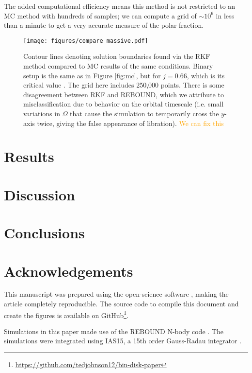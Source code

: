 \documentclass[twocolumn]{aastex631}
\newcommand\ghurl[0]{\url{https://github.com/tedjohnson12/bin-disk-paper}}
\newcommand{\TJ}[1]{\textcolor{orange}{#1}}
\begin{document}
The added computational efficiency means this method is not restricted to an MC method with hundreds of samples; we can compute a grid of $\sim 10^6$ in
less than a minute to get a very accurate measure of the polar fraction.

\begin{figure}
    \begin{centering}
        \texttt{[image: figures/compare\_massive.pdf]}
        \caption{
            Contour lines denoting solution boundaries found via the RKF method compared to MC results of the same conditions. Binary setup is the same
            as in Figure \ref{fig:mc}, but for $j=0.66$, which is its critical value \citep[see][]{martin2019,abod2022}. The grid here includes 250,000 points.
            There is some disagreement between RKF and {\sc REBOUND}, which we attribute to misclassification due to behavior on the orbital timescale (i.e. 
            small variations in $\Omega$ that cause the simulation to temporarily cross the $y$-axis twice, giving the false appearance of libration). \TJ{We can fix this}
        }
        \label{fig:rkf}
    \end{centering}
\end{figure}


\section{Results}
\label{sec:results}

\section{Discussion}
\label{sec:discussion}

\section{Conclusions}
\label{sec:conclusions}





\section{Acknowledgements}
\label{sec:ack}

This manuscript was prepared using the open-science software \href{https://show-your.work/en/latest/intro/}{\showyourwork} \citep{luger2021}, making the article completely
reproducible. The source code to compile this document and create the figures is available on GitHub\footnote{\ghurl}.

Simulations in this paper made use of the REBOUND N-body code \citep{rebound}.
The simulations were integrated using IAS15, a 15th order Gauss-Radau integrator \citep{reboundias15}. 



\end{document}
